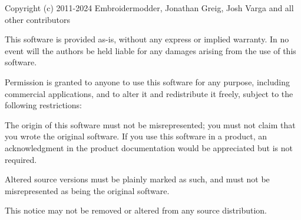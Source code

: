 Copyright (c) 2011-\/2024 Embroidermodder, Jonathan Greig, Josh Varga and all other contributors

This software is provided \textquotesingle{}as-\/is\textquotesingle{}, without any express or implied warranty. In no event will the authors be held liable for any damages arising from the use of this software.

Permission is granted to anyone to use this software for any purpose, including commercial applications, and to alter it and redistribute it freely, subject to the following restrictions\+:


\begin{DoxyEnumerate}
\item The origin of this software must not be misrepresented; you must not claim that you wrote the original software. If you use this software in a product, an acknowledgment in the product documentation would be appreciated but is not required.
\item Altered source versions must be plainly marked as such, and must not be misrepresented as being the original software.
\item This notice may not be removed or altered from any source distribution. 
\end{DoxyEnumerate}